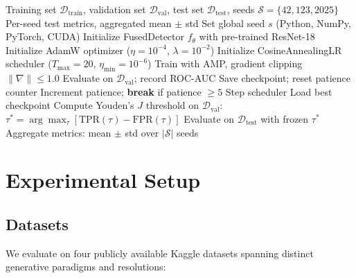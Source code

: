 \documentclass[conference]{IEEEtran}
\begin{document}
\begin{algorithm}[t]
\caption{Training and Evaluation Protocol}
\label{alg:training}
\begin{algorithmic}[1]
\renewcommand{\algorithmicrequire}{\textbf{Input:}}
\renewcommand{\algorithmicensure}{\textbf{Output:}}
\REQUIRE Training set $\mathcal{D}_{\text{train}}$, validation set $\mathcal{D}_{\text{val}}$, test set $\mathcal{D}_{\text{test}}$, seeds $\mathcal{S} = \{42, 123, 2025\}$
\ENSURE Per-seed test metrics, aggregated mean $\pm$ std
    \STATE Set global seed $s$ (Python, NumPy, PyTorch, CUDA)
    \STATE Initialize FusedDetector $f_\theta$ with pre-trained ResNet-18
    \STATE Initialize AdamW optimizer ($\eta = 10^{-4}$, $\lambda = 10^{-2}$)
    \STATE Initialize CosineAnnealingLR scheduler ($T_{\max} = 20$, $\eta_{\min} = 10^{-6}$)
        \STATE Train with AMP, gradient clipping $\|\nabla\| \leq 1.0$
        \STATE Evaluate on $\mathcal{D}_{\text{val}}$; record ROC-AUC
            \STATE Save checkpoint; reset patience counter
        \ELSE
            \STATE Increment patience; \textbf{break} if patience $\geq 5$
        \ENDIF
        \STATE Step scheduler
    \ENDFOR
    \STATE Load best checkpoint
    \STATE Compute Youden's $J$ threshold on $\mathcal{D}_{\text{val}}$:
    \STATE \quad $\tau^* = \arg\max_\tau [\text{TPR}(\tau) - \text{FPR}(\tau)]$
    \STATE Evaluate on $\mathcal{D}_{\text{test}}$ with frozen $\tau^*$
\ENDFOR
\STATE Aggregate metrics: mean $\pm$ std over $|\mathcal{S}|$ seeds
\end{algorithmic}
\end{algorithm}



\section{Experimental Setup}
\label{sec:setup}

\subsection{Datasets}

We evaluate on four publicly available Kaggle datasets spanning distinct generative paradigms and resolutions:
\end{document}
